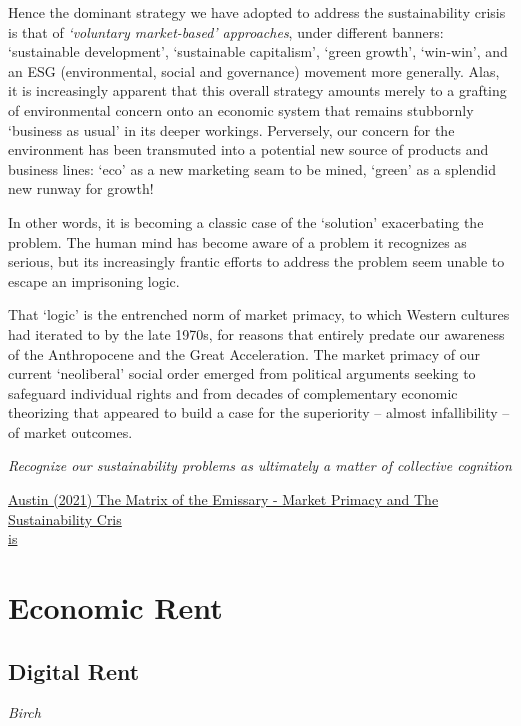 \documentclass[
]{book}
\begin{document}
Hence the dominant strategy we have adopted to address the sustainability crisis is that of \emph{`voluntary market-based' approaches}, under different banners: `sustainable development', `sustainable capitalism', `green growth', `win-win', and an ESG (environmental, social and governance) movement more generally. Alas, it is increasingly apparent that this overall strategy amounts merely to a grafting of environmental concern onto an economic system that remains stubbornly `business as usual' in its deeper workings. Perversely, our concern for the environment has been transmuted into a potential new source of products and business lines: `eco' as a new marketing seam to be mined, `green' as a splendid new runway for growth!

In other words, it is becoming a classic case of the `solution' exacerbating the problem.
The human mind has become aware of a problem it recognizes as serious, but its increasingly frantic efforts to address the problem seem unable to escape an imprisoning logic.

That `logic' is the entrenched norm of market primacy, to which Western cultures had iterated to by the late 1970s, for reasons that entirely predate our awareness of the Anthropocene and the Great Acceleration. The market primacy of our current `neoliberal' social order emerged from political arguments seeking to safeguard individual rights and from decades of complementary economic theorizing that appeared to build a case for the superiority -- almost infallibility -- of market outcomes.

\emph{Recognize our sustainability problems as ultimately a matter of collective cognition}

\href{https://channelmcgilchrist.com/articles/the-matrix-of-the-emissary/}{Austin (2021) The Matrix of the Emissary - Market Primacy and The Sustainability Cris\\
is}

\hypertarget{economic-rent}{%
\chapter{Economic Rent}\label{economic-rent}}

\hypertarget{digital-rent}{%
\section{Digital Rent}\label{digital-rent}}

\emph{Birch}
\end{document}
